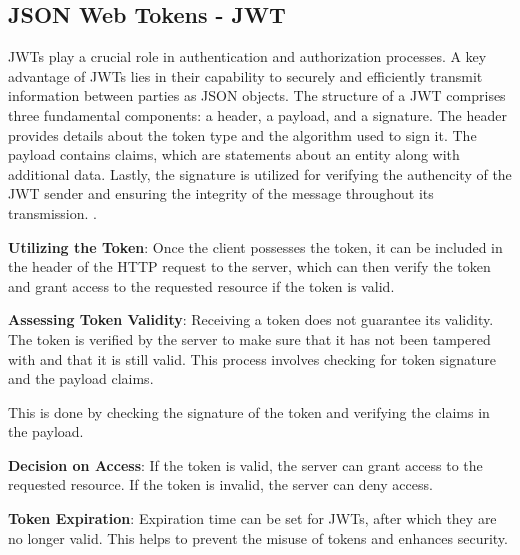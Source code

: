\subsection{JSON Web Tokens - JWT}

JWTs play a crucial role in authentication and authorization processes. A key advantage of JWTs lies in their capability to securely and efficiently transmit information
between parties as JSON objects. 
The structure of a JWT comprises three fundamental components: a header, a payload, and a signature. The header provides details about the token type and the algorithm used to sign it.
The payload contains claims, which are statements about an entity along with additional data. Lastly, the signature is utilized for verifying the authencity of the JWT sender
and ensuring the integrity of the message throughout its transmission. \cite{jwt}.

\textbf{Utilizing the Token}: Once the client possesses the token, it can be included in the header of the HTTP request to the server, which can then verify 
the token and grant access to the requested resource if the token is valid.

\textbf{Assessing Token Validity}: Receiving a token does not guarantee its validity. The token is verified by the server to make sure that it has not been tampered with
and that it is still valid. This process involves checking for token signature and the payload claims. 

This is done by checking the signature of the token and verifying the claims in the payload.

\textbf{Decision on Access}: If the token is valid, the server can grant access to the requested resource. If the token is invalid, the server can deny access.

\textbf{Token Expiration}: Expiration time can be set for JWTs, after which they are no longer valid. This helps to prevent the misuse of tokens and enhances security.



